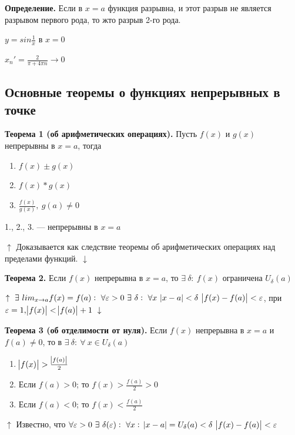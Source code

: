 \documentclass{article}
\begin{document}
    \textbf{Определение.} Если в \(x=a\) функция разрывна, и этот разрыв не является разрывом первого рода, то жто разрыв 2-го рода.

    \(y = sin \frac{1}{x}\) в \(x=0\)

    \(x_n'=\frac{2}{\pi+4\pi n} \rightarrow 0\)

    \subsection{Основные теоремы о функциях непрерывных в точке}

    \textbf{Теорема 1 (об арифметических операциях).} Пусть \(f(x)\) и \(g(x)\) непрерывны в \(x = a\), тогда 

    \begin{enumerate}
        \item \( f(x) \pm g(x) \)
        \item \( f(x) * g(x) \)
        \item \( \frac{f(x)}{g(x)},\ g(a) \neq 0 \)
    \end{enumerate}
    
    1., 2., 3. --- непрерывны в \(x=a\)

    \(\uparrow\) Доказывается как следствие теоремы об арифметических операциях над пределами функций. \(\downarrow\)

    \textbf{Теорема 2.} Если \(f(x)\) непрерывна в \(x = a\), то \(\exists\ \delta:\ f(x)\) ограничена \(U_{\delta}(a)\)
    
    \(\uparrow\ \exists\ lim_{x \rightarrow a} f(x)=f(a):\ \forall \varepsilon > 0\ \exists\ \delta:\ \forall x\ \abs{x-a}<\delta\ \abs{f(x)-f(a)} < \varepsilon\), при \(\varepsilon = 1, \abs{f(x)}<\abs{f(a)}+1\ \downarrow\)


    \textbf{Теорема 3 (об отделимости от нуля).} Если \(f(x)\) непрерывна в \(x = a\) и \( f(a) \neq 0 \), то в \(\exists\ \delta:\ \forall\ x \in U_{\delta}(a)\)

    \begin{enumerate}
        \item \(\abs{f(x)}>\frac{\abs{f(a)}}{2}\)
        \item Если \(f(a)>0\); то \(f(x)>\frac{f(a)}{2}>0\)
        \item Если \(f(a)<0\); то \(f(x)<\frac{f(a)}{2}\)
    \end{enumerate}

    \(\uparrow\) Известно, что \(\forall \varepsilon > 0\ \exists\ \delta(\varepsilon):\ \forall x:\ \abs{x-a}=U_\delta(a)<\delta\ \abs{f(x)-f(a)}<\varepsilon\)
\end{document}

